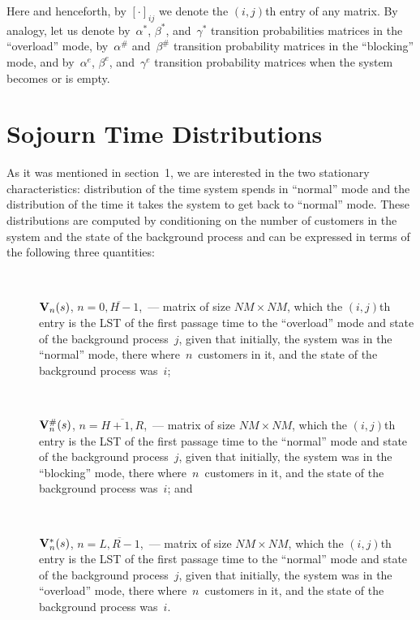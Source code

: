 \begin{multicols}{2}
\noindent
Here and henceforth, by $[\cdot]_{ij}$ we denote the $(i,j)${th}
 entry of any matrix.
By analogy, let us denote by~$\alpha^*$, $\beta^*$, and~$\gamma^*$
transition probabilities matrices in the ``overload'' mode,
by~$\alpha^{\#}$ and~$\beta^{\#}$
transition probability matrices  
in the ``blocking'' mode,
and by~$\alpha^{e}$, $\beta^{e}$, and~$\gamma^{e}$
transition probability matrices when
the system becomes or is empty.


\section{Sojourn Time Distributions}

\noindent
As it was mentioned in section~1,
we are interested in the two stationary characteristics:
distribution of the time system spends in ``normal'' mode
and the distribution of the time it takes the  system to get back 
to ``normal'' mode. These distributions are computed by 
conditioning on the number of customers in the system
and the state of the background process
and can be expressed in terms of
the following three quantities:
\begin{description}
\item[\,] $\mathbf{V}_n(s)$, $n=\overline{0,H-1}$,~---
matrix of size $NM\times NM$,
which the $(i,j)${th} entry is
the LST of the first passage time 
to the ``overload'' mode 
and state of the background process~$j$, 
given that initially, the 
system was in the ``normal'' mode,
there where~$n$~customers in it,
and
the state of the background process was~$i$;
\item[\,] 
$\mathbf{V}^{\#}_n(s)$, $n=\overline{H+1,R}$,~---
matrix of size $NM\times NM$,
which the $(i,j)${th} entry is
the LST of the first passage time 
to the ``normal'' mode 
and state of the background process~$j$, 
given that initially, the 
system was in the ``blocking'' mode,
there where~$n$~customers in it,
and
the state of the background process was~$i$; and
\item[\,] 
$\mathbf{V}^*_n(s)$, $n=\overline{L,R-1}$,~---
matrix of size $NM\times NM$,
which the $(i,j)${th} entry is
the LST of the first passage time 
to the ``normal'' mode 
and state of the background process~$j$, 
given that initially, the 
system was in the ``overload'' mode,
there where~$n$~customers in it,
and
the state of the background process was~$i$.
\end{description}


\end{multicols}
